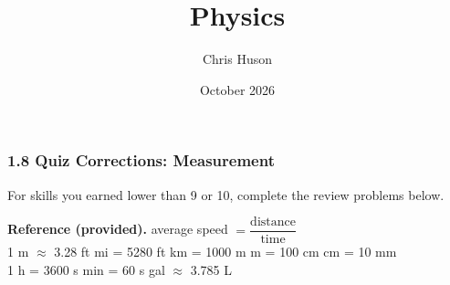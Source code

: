 \documentclass[12pt, twoside]{article}
\title{Physics}
\author{Chris Huson}
\date{October 2026}
\begin{document}
\subsubsection*{1.8 Quiz Corrections: Measurement}

For skills you earned lower than 9 or 10, complete the review problems below.

\vspace{0.2cm}

\textbf{Reference (provided).} \quad
average speed $= \dfrac{\text{distance}}{\text{time}}$ \\[0.1cm]
1 m $\approx$ 3.28 ft  mi = 5280 ft  km = 1000 m  m = 100 cm
 cm = 10 mm \\
1 h = 3600 s  min = 60 s  gal $\approx$ 3.785 L

\vspace{0.3cm}
\end{document}
